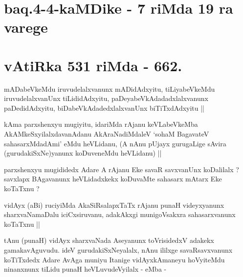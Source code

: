 
\section*{baq.4-4-kaMDike - 7 riMda 19 ra varege}

\section*{vAtiRka 531 riMda - 662.}


\begin{artha}
mADabeVkeMdu iruvudelalxvanunx mADidAdxyitu, tiLiyabeVkeMdu
iruvudelalxvanUnx tiLididAdxyitu, paDeyabeVkAdadadxlalxvanunx
paDedidAdxyitu, biDabeVkAdadedxlalxvanUnx biTiTxdAdxyitu ||
\end{artha}


\begin{artha}
kAma parxshenxyu mugiyitu, idariMda rAjanu keVLabeVkeMba
AkAMkeSxyilalxdavanAdanu AkAraNadiMdaleV `so\s haM BagavateV
sahasarxMdadAmi' eMdu heVLidanu, (A nAnu pUjayx gurugaLige sAvira
(gurudakiSxNe)yanunx koDuveneMdu heVLidanu) ||
\end{artha} 


\begin{artha}
parxshenxyu mugididedx Adare A rAjanu Eke savaR savxvanUnx koDalilalx
? savxlapx BAgavanunx heVLidadxkekx koDuvaMte sahasarx mAtarx Eke
koTaTxnu ?
\end{artha}


\begin{artha}
vidAyx (aBi) ruciyiMda AkaSiRsalapxTaTx rAjanu punaH videyxyanunx
sharxvaNamaDalu iciCxsiruvanu, adakAkxgi munigoVsakxra sahasarxvanunx
koTaTxnu ||
\end{artha}


\begin{artha}
tAnu (punaH) vidAyx sharxvaNada Aseyanunx toVrisidedxV adakekx
gamakavAguvudu. ideV gurudakiSxNeyalalx, nAnu ililxge savaRsavxvanunx
koTiTxdedx Adare AvAga muniyu Itanige vidAyxkAmaneyu hoVyiteMdu
ninanxnunx tiLidu punaH heVLuvudeVyilalx - eMba -
\end{artha}

